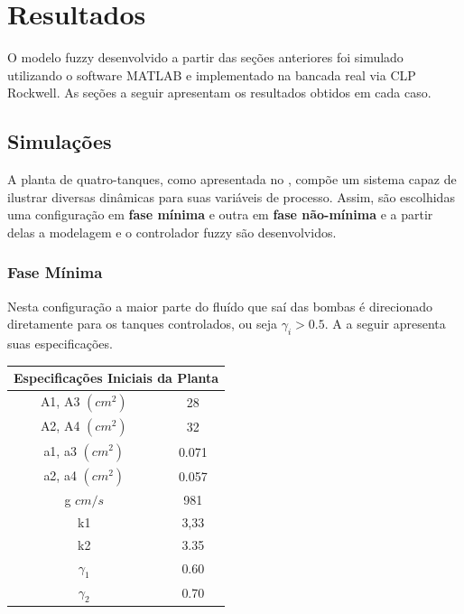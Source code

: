 %

\chapter{Resultados} \label{capRes}

O modelo fuzzy desenvolvido a partir das seções anteriores foi simulado utilizando o software MATLAB e implementado na bancada real via CLP Rockwell. As seções a seguir apresentam os resultados obtidos em cada caso.

\section{Simulações} \label{secAnalise}
A planta de quatro-tanques, como apresentada no , compõe um sistema capaz de ilustrar diversas dinâmicas para suas variáveis de processo. Assim, são escolhidas uma configuração em \textbf{fase mínima }e outra em \textbf{fase não-mínima} e a partir delas a modelagem e o controlador fuzzy são desenvolvidos. 

\subsection{Fase Mínima}
Nesta configuração a maior parte do fluído que saí das bombas é direcionado diretamente para os tanques controlados, ou seja $\gamma_i > 0.5$. A  a seguir apresenta suas especificações.

\begin{center} \label{tabFaseMinima}
	\begin{tabular}{|c|c|}
		\hline
		\multicolumn{2}{|c|}{Especificações Iniciais da Planta} \\
		\hline
		A1, A3 $(cm^2)$ & 28 \\ \hline
		A2, A4 $(cm^2)$ & 32 \\ \hline
		a1, a3 $(cm^2)$ & 0.071 \\ \hline
		a2, a4 $(cm^2)$ & 0.057 \\ \hline
		g $cm/s$ & 981 \\ \hline
		k1 & 3,33 \\ \hline
		k2 & 3.35 \\ \hline
		$\gamma_1$ & 0.60 \\ \hline
		$\gamma_2$ & 0.70 \\ \hline
		\hline
	\end{tabular}
\end{center}

